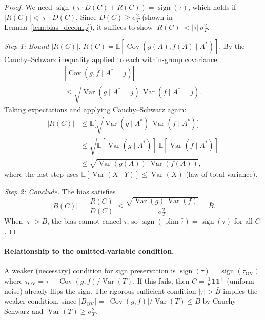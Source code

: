 \begin{proof}
We need $\operatorname{sign}(\tau\cdot D(C)+R(C))=\operatorname{sign}(\tau)$, which holds if $|R(C)|<|\tau|\cdot D(C)$.
Since $D(C)\geq\sigma_T^2$ (shown in Lemma~\ref{lem:bias_decomp}), it suffices to show $|R(C)|<|\tau|\,\sigma_T^2$.

\emph{Step 1: Bound $|R(C)|$.}
$R(C)=\mathbb{E}[\operatorname{Cov}(g(A),f(A)\mid A^*)]$.
By the Cauchy--Schwarz inequality applied to each within-group covariance:
\begin{multline*}
  |\operatorname{Cov}(g,f\mid A^*{=}j)|\\
  \leq \sqrt{\operatorname{Var}(g\mid A^*{=}j)\,\operatorname{Var}(f\mid A^*{=}j)}.
\end{multline*}
Taking expectations and applying Cauchy--Schwarz again:
\begin{align*}
  |R(C)|
  &\leq \mathbb{E}\bigl[\sqrt{\operatorname{Var}(g\mid A^*)\,\operatorname{Var}(f\mid A^*)}\bigr]\\
  &\leq \sqrt{\mathbb{E}[\operatorname{Var}(g\mid A^*)]\;\mathbb{E}[\operatorname{Var}(f\mid A^*)]}\\
  &\leq \sqrt{\operatorname{Var}(g(A))\;\operatorname{Var}(f(A))},
\end{align*}
where the last step uses $\mathbb{E}[\operatorname{Var}(X\mid Y)]\leq\operatorname{Var}(X)$ (law of total variance).

\emph{Step 2: Conclude.}
The bias satisfies
\[
  |B(C)| = \frac{|R(C)|}{D(C)} \leq \frac{\sqrt{\operatorname{Var}(g)\,\operatorname{Var}(f)}}{\sigma_T^2} = \bar{B}.
\]
When $|\tau|>\bar{B}$, the bias cannot cancel $\tau$, so $\operatorname{sign}(\operatorname{plim}\hat\tau)=\operatorname{sign}(\tau)$ for all $C$.
\end{proof}

\paragraph{Relationship to the omitted-variable condition.}
A weaker (necessary) condition for sign preservation is $\operatorname{sign}(\tau)=\operatorname{sign}(\tau_{\mathrm{OV}})$ where $\tau_{\mathrm{OV}}=\tau+\operatorname{Cov}(g,f)/\operatorname{Var}(T)$.
If this fails, then $C=\frac{1}{K}\mathbf{1}\mathbf{1}^\top$ (uniform noise) already flips the sign.
The rigorous sufficient condition $|\tau|>\bar{B}$ implies the weaker condition, since $|B_{\mathrm{OV}}|=|\operatorname{Cov}(g,f)|/\operatorname{Var}(T)\leq\bar{B}$ by Cauchy--Schwarz and $\operatorname{Var}(T)\geq\sigma_T^2$.

